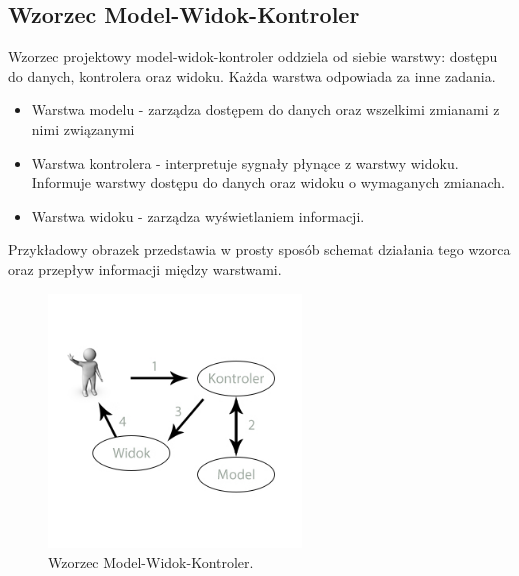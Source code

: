 \documentclass[12pt]{report}
\begin{document}
\subsection{Wzorzec Model-Widok-Kontroler}
	\indent Wzorzec projektowy model-widok-kontroler oddziela od siebie warstwy: dostępu do danych, kontrolera oraz widoku. Każda warstwa odpowiada za inne zadania.
	\begin{itemize}
	\item Warstwa modelu - zarządza dostępem do danych oraz wszelkimi zmianami z nimi związanymi
	\item Warstwa kontrolera - interpretuje sygnały płynące z warstwy widoku. Informuje warstwy dostępu do danych oraz widoku o wymaganych zmianach.
	\item Warstwa widoku - zarządza wyświetlaniem informacji. 
	\end{itemize}
Przykładowy obrazek przedstawia w prosty sposób schemat działania tego wzorca oraz przepływ informacji między warstwami. \\
\begin{figure}[h]
	\centering
	\includegraphics[width=0.6\textwidth]{images/mvc.jpg}
	\caption{Wzorzec Model-Widok-Kontroler. \cite{mvcimg}}
\end{figure}
\FloatBarrier
\end{document}
